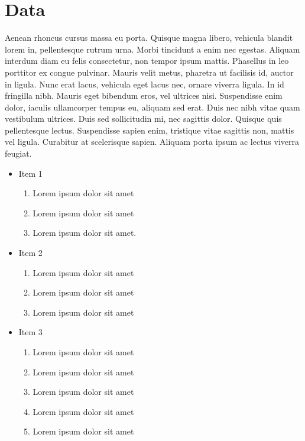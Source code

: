 \documentclass[linenumbers,RNAAS,trackchanges]{aastex631}
\begin{document}
\section{Data} \label{sec:data}
Aenean rhoncus cursus massa eu porta. Quisque magna libero, vehicula blandit lorem in, pellentesque rutrum urna. Morbi tincidunt a enim nec egestas. Aliquam interdum diam eu felis consectetur, non tempor ipsum mattis. Phasellus in leo porttitor ex congue pulvinar. Mauris velit metus, pharetra ut facilisis id, auctor in ligula. Nunc erat lacus, vehicula eget lacus nec, ornare viverra ligula. In id fringilla nibh. Mauris eget bibendum eros, vel ultrices nisi. Suspendisse enim dolor, iaculis ullamcorper tempus eu, aliquam sed erat. Duis nec nibh vitae quam vestibulum ultrices. Duis sed sollicitudin mi, nec sagittis dolor. Quisque quis pellentesque lectus. Suspendisse sapien enim, tristique vitae sagittis non, mattis vel ligula. Curabitur at scelerisque sapien. Aliquam porta ipsum ac lectus viverra feugiat.

\begin{itemize}
 \item{Item 1}
   \begin{enumerate}
      \item Lorem ipsum dolor sit amet
      \item Lorem ipsum dolor sit amet
      \item Lorem ipsum dolor sit amet.
    \end{enumerate}
  \item{Item 2}
    \begin{enumerate}
      \item Lorem ipsum dolor sit amet
      \item Lorem ipsum dolor sit amet
      \item Lorem ipsum dolor sit amet
    \end{enumerate}
  \item{Item 3}
    \begin{enumerate}
      \item Lorem ipsum dolor sit amet
      \item Lorem ipsum dolor sit amet
      \item Lorem ipsum dolor sit amet
      \item Lorem ipsum dolor sit amet
      \item Lorem ipsum dolor sit amet
    \end{enumerate}
\end{itemize}
\end{document}
